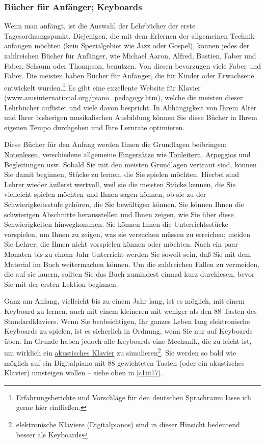 \subsubsection{Bücher für Anfänger; Keyboards}
\label{c1iii18b}

Wenn man anfängt, ist die Auswahl der Lehrbücher der erste Tagesordnungspunkt.
Diejenigen, die mit dem Erlernen der allgemeinen Technik anfangen möchten (kein Spezialgebiet wie Jazz oder Gospel), können jedes der zahlreichen Bücher für Anfänger, wie Michael Aaron, Alfred, Bastien, Faber und Faber, Schaum oder Thompson, benutzen.
Von diesen bevorzugen viele Faber und Faber.
Die meisten haben Bücher für Anfänger, die für Kinder oder Erwachsene entwickelt wurden.\footnote{Erfahrungsberichte und Vorschläge für den deutschen Sprachraum lasse ich gerne hier einfließen.}
Es gibt eine exzellente Website für Klavier (www.amsinternational.org/piano_pedagogy.htm), welche die meisten dieser Lehrbücher auflistet und viele davon bespricht.
In Abhängigkeit von Ihrem Alter und Ihrer bisherigen musikalischen Ausbildung können Sie diese Bücher in Ihrem eigenen Tempo durchgehen und Ihre Lernrate optimieren.

Diese Bücher für den Anfang werden Ihnen die Grundlagen beibringen: \hyperref[c1iii11]{Notenlesen}, verschiedene allgemeine \hyperref[c1ii18]{Fingersätze} wie \hyperref[c1iii5a]{Tonleitern}, \hyperref[Arpeggios]{Arpeggios} und Begleitungen usw.
Sobald Sie mit den meisten Grundlagen vertraut sind, können Sie damit beginnen, Stücke zu lernen, die Sie spielen möchten.
Hierbei sind Lehrer wieder äußerst wertvoll, weil sie die meisten Stücke kennen, die Sie vielleicht spielen möchten und 
Ihnen sagen können, ob sie zu der Schwierigkeitsstufe gehören, die Sie bewältigen können.
Sie können Ihnen die schwierigen Abschnitte herausstellen und Ihnen zeigen, wie Sie über diese Schwierigkeiten hinwegkommen.
Sie können Ihnen die Unterrichtsstücke vorspielen, um Ihnen zu zeigen, was sie versuchen müssen zu erreichen; meiden Sie Lehrer, die Ihnen nicht vorspielen können oder möchten.
Nach ein paar Monaten bis zu einem Jahr Unterricht werden Sie soweit sein, daß Sie mit dem Material im Buch weitermachen können.
Um die zahlreichen Fallen zu vermeiden, die auf sie lauern, sollten Sie das Buch zumindest einmal kurz durchlesen, bevor Sie mit der ersten Lektion beginnen.

Ganz am Anfang, vielleicht bis zu einem Jahr lang, ist es möglich, mit einem Keyboard zu lernen, auch mit einem kleineren mit weniger als den 88 Tasten des Standardklaviers.
Wenn Sie beabsichtigen, Ihr ganzes Leben lang elektronische Keyboards zu spielen, ist es sicherlich in Ordnung, wenn Sie nur auf Keyboards üben.
Im Grunde haben jedoch alle Keyboards eine Mechanik, die zu leicht ist, um wirklich ein \hyperref[c1iii17c]{akustisches Klavier} zu simulieren\footnote{\hyperref[c1iii17b]{elektronische Klaviere} (Digitalpianos) sind in dieser Hinsicht bedeutend besser als Keyboards}.
Sie werden so bald wie möglich auf ein Digitalpiano mit 88 gewichteten Tasten (oder ein akustisches Klavier) umsteigen wollen -- siehe oben in \hyperref[c1iii17]{\autoref{c1iii17}}.


